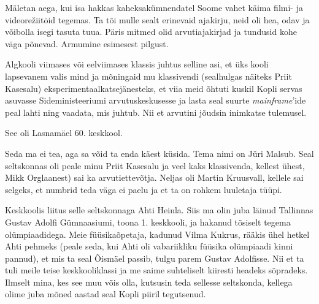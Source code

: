 

Mäletan aega, kui isa hakkas kaheksakümnendatel Soome vahet 
käima filmi- ja videorežiitöid tegemas. Ta tõi mulle sealt erinevaid ajakirju, neid oli 
hea, odav ja võibolla isegi tasuta tuua. Päris mitmed olid 
arvutiajakirjad ja tundusid kohe väga põnevad. Armumine esimesest 
pilgust. 

Algkooli viimases või eelviimases klassis juhtus selline asi, et 
üks kooli lapsevanem valis mind ja mõningaid mu klassivendi (sealhulgas näiteks 
Priit Kasesalu) eksperimentaalkatsejänesteks, et 
viia meid õhtuti kuskil Kopli servas asuvasse Sideministeeriumi 
arvutuskeskusesse ja lasta seal 
suurte \emph{mainframe}'ide peal lahti ning vaadata, mis juhtub. Nii et arvutini jõudsin inimkatse 
tulemusel. 


See oli Lasnamäel 60. keskkool.


Seda ma ei tea, aga sa võid ta enda käest küsida. Tema nimi on Jüri 
Malsub. 
Seal seltskonnas oli peale minu Priit Kasesalu ja veel kaks klassivenda, kellest 
ühest, Mikk Orglaanest) sai ka arvutiettevõtja. Neljas 
oli Martin Kruusvall, kellele sai selgeks, et 
numbrid teda väga ei paelu ja et ta on rohkem luuletaja tüüpi.

Keskkoolis liitus selle seltskonnaga Ahti Heinla. Siis 
ma olin juba läinud Tallinnas Gustav Adolfi Gümnaasiumi, toona 1.
keskkooli, ja hakanud tõsiselt tegema 
olümpiaadidega. Meie füüsikaõpetaja, kadunud Vilma Kukrus, rääkis ühel hetkel Ahti pehmeks (peale seda, kui Ahti oli vabariikliku füüsika olümpiaadi 
kinni pannud), et mis ta seal Õismäel passib, tulgu parem 
Gustav Adolfisse. Nii et ta tuli meile teise keskkooliklassi ja me saime suhteliselt kiiresti headeks sõpradeks. Ilmselt mina, kes 
see muu võis olla, kutsusin teda sellesse seltskonda, kellega olime juba 
mõned aastad seal Kopli piiril tegutsenud. 


